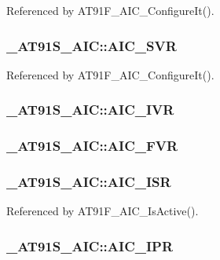 Referenced by AT91F\_\-AIC\_\-ConfigureIt().\hypertarget{struct__AT91S__AIC_ab87ea86f3a65a32f8d4c788cc8c56ae}{
\subsubsection{ {\bf \_\-AT91S\_\-AIC::AIC\_\-SVR}}}
\label{struct__AT91S__AIC_ab87ea86f3a65a32f8d4c788cc8c56ae}




Referenced by AT91F\_\-AIC\_\-ConfigureIt().\hypertarget{struct__AT91S__AIC_f105953c155379836fce666eef37501b}{
\subsubsection{ {\bf \_\-AT91S\_\-AIC::AIC\_\-IVR}}}
\label{struct__AT91S__AIC_f105953c155379836fce666eef37501b}


\hypertarget{struct__AT91S__AIC_ccca387631438422260c8a8652800eed}{
\subsubsection{ {\bf \_\-AT91S\_\-AIC::AIC\_\-FVR}}}
\label{struct__AT91S__AIC_ccca387631438422260c8a8652800eed}


\hypertarget{struct__AT91S__AIC_3634430d76ed81bcbd9f0b04f9c0907e}{
\subsubsection{ {\bf \_\-AT91S\_\-AIC::AIC\_\-ISR}}}
\label{struct__AT91S__AIC_3634430d76ed81bcbd9f0b04f9c0907e}




Referenced by AT91F\_\-AIC\_\-IsActive().\hypertarget{struct__AT91S__AIC_9ae6e5e104c8f5a405a1792e5126236a}{
\subsubsection{ {\bf \_\-AT91S\_\-AIC::AIC\_\-IPR}}}
\label{struct__AT91S__AIC_9ae6e5e104c8f5a405a1792e5126236a}




